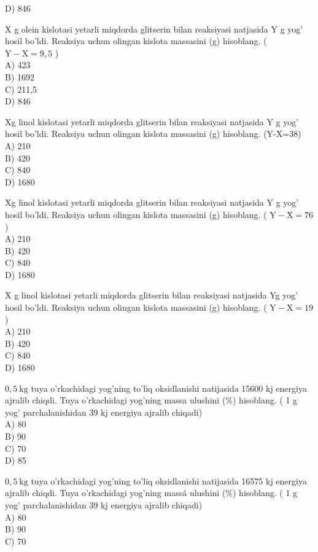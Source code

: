 D) 846
  \item X g olein kislotasi yetarli miqdorda glitserin bilan reaksiyasi natjasida Y g yog' hosil bo'ldi. Reaksiya uchun olingan kislota massasini (g) hisoblang. ( $\mathrm{Y}-\mathrm{X}=9,5$ )\\
A) 423\\
B) 1692\\
C) 211,5\\
D) 846
  \item Xg linol kislotasi yetarli miqdorda glitserin bilan reaksiyasi natjasida Y g yog' hosil bo'ldi. Reaksiya uchun olingan kislota massasini (g) hisoblang. (Y-X=38)\\
A) 210\\
B) 420\\
C) 840\\
D) 1680
  \item Xg linol kislotasi yetarli miqdorda glitserin bilan reaksiyasi natjasida Y g yog' hosil bo'ldi. Reaksiya uchun olingan kislota massasini (g) hisoblang. ( $\mathrm{Y}-\mathrm{X}=76$ )\\
A) 210\\
B) 420\\
C) 840\\
D) 1680
  \item X g linol kislotasi yetarli miqdorda glitserin bilan reaksiyasi natjasida Yg yog' hosil bo'ldi. Reaksiya uchun olingan kislota massasini (g) hisoblang. ( $\mathrm{Y}-\mathrm{X}=19$ )\\
A) 210\\
B) 420\\
C) 840\\
D) 1680
  \item $0,5 \mathrm{~kg}$ tuya o'rkachidagi yog'ning to'liq oksidlanishi natijasida 15600 kj energiya ajralib chiqdi. Tuya o'rkachidagi yog'ning massa ulushini (\%) hisoblang. ( 1 g yog' parchalanishidan 39 kj energiya ajralib chiqadi)\\
A) 80\\
B) 90\\
C) 70\\
D) 85
  \item $0,5 \mathrm{~kg}$ tuya o'rkachidagi yog'ning to'liq oksidlanishi natijasida 16575 kj energiya ajralib chiqdi. Tuya o'rkachidagi yog'ning massá ulushini (\%) hisoblang. ( 1 g yog' parchalanishidan 39 kj energiya ajralib chiqadi)\\
A) 80\\
B) 90\\
C) 70\\
